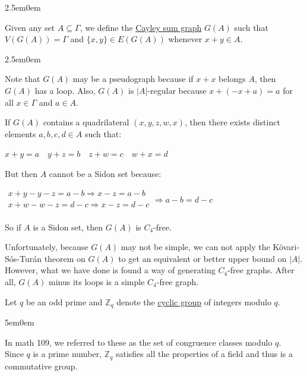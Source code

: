 \documentclass{book}
\newcommand{\hTwo}{%
   \color{MidnightBlue}%
   \fontsize{13}{15}\selectfont%
}
\newcommand{\hThree}{%
   \color{PineGreen}
   \fontsize{13}{15}\selectfont%
}
\newcommand{\myComment}{%
   \color{RawerSienna}%
   \fontsize{12}{14}\selectfont%
}
\newenvironment{myIndent}{%
   \begin{adjustwidth}{2.5em}{0em}%
}{%
   \end{adjustwidth}%
}
\newenvironment{myDindent}{%
   \begin{adjustwidth}{5em}{0em}%
}{%
   \end{adjustwidth}%
}
\newcommand{\udefine}[1]{{%
   \setulcolor{Red}%
   \setul{0.14em}{0.07em}%
   \ul{#1}%
}}
\newcommand{\retTwo}{\hfill\bigbreak}
\begin{document}
{\begin{myIndent} \hTwo
   Given any set $A \subseteq \Gamma$, we define the \udefine{Cayley sum graph} $G(A)$ such that $V(G(A)) = \Gamma$ and $\{x, y\} \in E(G(A))$ whenever $x + y \in A$.
   
   {\begin{myIndent} \hThree
      Note that $G(A)$ may be a pseudograph because if $x + x$ belongs $A$, then $G(A)$ has a loop. Also, $G(A)$ is $|A|$-regular because $x + (-x + a) = a$ for all $x \in \Gamma$ and $a \in A$. \retTwo
      
      If $G(A)$ contains a quadrilateral $(x, y, z, w, x)$, then there exists distinct\\ elements $a, b, c, d \in A$ such that:
      
      {\center $ x + y = a \quad y + z = b \quad z + w = c \quad w + x = d $ \retTwo\par}
   
      But then $A$ cannot be a Sidon set because:
      
      {\center$
      \begin{matrix}
         x + y - y - z = a - b \Longrightarrow x - z = a - b \\
         x + w - w - z = d - c \Longrightarrow x - z = d - c \\
      \end{matrix} \Longrightarrow a - b = d - c$ \retTwo\par}
   
      So if $A$ is a Sidon set, then $G(A)$ is $C_4$-free. \retTwo

      Unfortunately, because $G(A)$ may not be simple, we can not apply the Kövari-Sós-Turán theorem on $G(A)$ to get an equivalent or better upper bound on $|A|$. However, what we have done is found a way of generating $C_4$-free graphs. After all, $G(A)$ minus its loops is a simple $C_4$-free graph.
   \end{myIndent}}
\end{myIndent}}

\newpage

Let $q$ be an odd prime and $\mathbb{Z}_q$ denote the \udefine{cyclic group} of integers modulo $q$.
{\begin{myDindent} \myComment
   In math 109, we referred to these as the set of congruence classes modulo $q$. \\ Since $q$ is a prime number, $\mathbb{Z}_q$ satisfies all the properties of a field and thus is a commutative group. \retTwo
\end{myDindent}}
\end{document}
